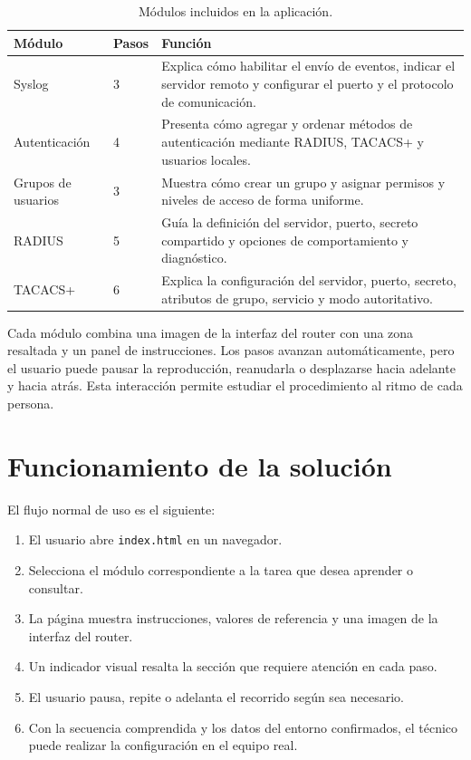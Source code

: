 \documentclass[12pt,letterpaper]{article}
\begin{document}
\begin{table}[htbp]
\centering
\small
\begin{tabularx}{\textwidth}{@{}p{2.7cm}p{1.5cm}X@{}}
\toprule
\textbf{Módulo} & \textbf{Pasos} & \textbf{Función} \\
\midrule
Syslog & 3 & Explica cómo habilitar el envío de eventos, indicar el servidor remoto y configurar el puerto y el protocolo de comunicación. \\
Autenticación & 4 & Presenta cómo agregar y ordenar métodos de autenticación mediante RADIUS, TACACS+ y usuarios locales. \\
Grupos de usuarios & 3 & Muestra cómo crear un grupo y asignar permisos y niveles de acceso de forma uniforme. \\
RADIUS & 5 & Guía la definición del servidor, puerto, secreto compartido y opciones de comportamiento y diagnóstico. \\
TACACS+ & 6 & Explica la configuración del servidor, puerto, secreto, atributos de grupo, servicio y modo autoritativo. \\
\bottomrule
\end{tabularx}
\caption{Módulos incluidos en la aplicación.}
\label{tab:modulos}
\end{table}

Cada módulo combina una imagen de la interfaz del router con una zona resaltada y
un panel de instrucciones. Los pasos avanzan automáticamente, pero el usuario puede
pausar la reproducción, reanudarla o desplazarse hacia adelante y hacia atrás. Esta
interacción permite estudiar el procedimiento al ritmo de cada persona.

\section{Funcionamiento de la solución}

El flujo normal de uso es el siguiente:

\begin{enumerate}[leftmargin=*]
    \item El usuario abre \texttt{index.html} en un navegador.
    \item Selecciona el módulo correspondiente a la tarea que desea aprender o
    consultar.
    \item La página muestra instrucciones, valores de referencia y una imagen de la
    interfaz del router.
    \item Un indicador visual resalta la sección que requiere atención en cada paso.
    \item El usuario pausa, repite o adelanta el recorrido según sea necesario.
    \item Con la secuencia comprendida y los datos del entorno confirmados, el
    técnico puede realizar la configuración en el equipo real.
\end{enumerate}
\end{document}
